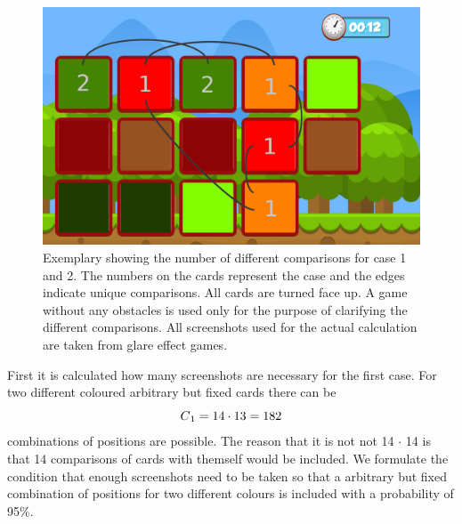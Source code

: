 \begin{figure}[H]
	\centering
	\includegraphics[width=14cm]{images/noObstTurnedNotes.png}
	\caption[Bild kurz]{Exemplary showing the number of different comparisons for case 1 and 2. The numbers on the cards represent the case and the edges indicate unique comparisons. All cards are turned face up. A game without any obstacles is used only for the purpose of clarifying the different comparisons. All screenshots used for the actual calculation are taken from glare effect games.}
	\label{fig:noObstTurnedNotes}
\end{figure}

First it is calculated how many screenshots are necessary for the first case. For two different coloured arbitrary but fixed cards there can be 
\begin{equation*}
C\textsubscript{1} = 14 \cdot 13 = 182 
\end{equation*}
combinations of positions are possible. The reason that it is not not 14 $\cdot$ 14 is that 14 comparisons of cards with themself would be included. We formulate the condition that enough screenshots need to be taken so that a arbitrary but fixed combination of positions for two different colours is included with a probability of 95\%. 

